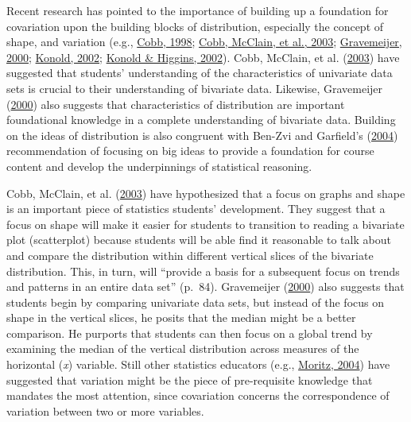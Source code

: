 \documentclass[11pt]{umnthesis}
\begin{document}
Recent research has pointed to the importance of building up a foundation for covariation upon the building blocks of distribution, especially the concept of shape, and variation (e.g., \protect\hyperlink{ref-cobb:1998}{Cobb, 1998}; \protect\hyperlink{ref-cobb:2003a}{Cobb, McClain, et al., 2003}; \protect\hyperlink{ref-gravemeijer:2000}{Gravemeijer, 2000}; \protect\hyperlink{ref-konold:2002}{Konold, 2002}; \protect\hyperlink{ref-konold:2002a}{Konold \& Higgins, 2002}). Cobb, McClain, et al. (\protect\hyperlink{ref-cobb:2003a}{2003}) have suggested that students' understanding of the characteristics of univariate data sets is crucial to their understanding of bivariate data. Likewise, Gravemeijer (\protect\hyperlink{ref-gravemeijer:2000}{2000}) also suggests that characteristics of distribution are important foundational knowledge in a complete understanding of bivariate data. Building on the ideas of distribution is also congruent with Ben-Zvi and Garfield's (\protect\hyperlink{ref-ben-zvi:2004}{2004}) recommendation of focusing on big ideas to provide a foundation for course content and develop the underpinnings of statistical reasoning.

Cobb, McClain, et al. (\protect\hyperlink{ref-cobb:2003a}{2003}) have hypothesized that a focus on graphs and shape is an important piece of statistics students' development. They suggest that a focus on shape will make it easier for students to transition to reading a bivariate plot (scatterplot) because students will be able find it reasonable to talk about and compare the distribution within different vertical slices of the bivariate distribution. This, in turn, will ``provide a basis for a subsequent focus on trends and patterns in an entire data set'' (p.~84). Gravemeijer (\protect\hyperlink{ref-gravemeijer:2000}{2000}) also suggests that students begin by comparing univariate data sets, but instead of the focus on shape in the vertical slices, he posits that the median might be a better comparison. He purports that students can then focus on a global trend by examining the median of the vertical distribution across measures of the horizontal (\emph{x}) variable. Still other statistics educators (e.g., \protect\hyperlink{ref-moritz:2004}{Moritz, 2004}) have suggested that variation might be the piece of pre-requisite knowledge that mandates the most attention, since covariation concerns the correspondence of variation between two or more variables.
\end{document}
